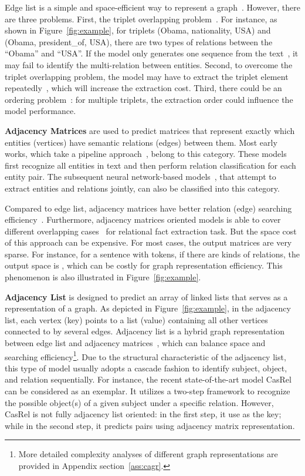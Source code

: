 \documentclass[11pt,a4paper]{article}
\begin{document}
Edge list is a simple and space-efficient way to represent a graph~\cite{arifuzzaman2015fast}. However, there are three problems. First, the triplet overlapping problem~\cite{zeng2018extracting}. For instance, as shown in Figure~\ref{fig:example}, for triplets (Obama, nationality, USA) and (Obama, president\_of, USA), there are two types of relations between the ``Obama'' and ``USA''. If the model only generates one sequence from the text~\cite{zheng2017joint}, it may fail to identify the multi-relation between entities. Second, to overcome the triplet overlapping problem, the model may have to extract the triplet element repeatedly~\cite{zeng2018extracting}, which will increase the extraction cost. Third, there could be an ordering problem~\cite{zeng2019learning}: for multiple triplets, the extraction order could influence the model performance.

\textbf{Adjacency Matrices} are used to predict matrices that represent exactly which entities (vertices) have semantic relations (edges) between them. Most early works, which take a pipeline approach~\cite{zelenko2003kernel,zhou2005exploring}, belong to this category. These models first recognize all entities in text and then perform relation classification for each entity pair. The subsequent neural network-based models~\cite{bekoulis2018joint,dai2019joint}, that attempt to extract entities and relations jointly, can also be classified into this category. 

Compared to edge list, adjacency matrices have better relation (edge) searching efficiency~\cite{arifuzzaman2015fast}. Furthermore, adjacency matrices oriented models is able to cover different overlapping cases~\cite{zeng2018extracting} for relational fact extraction task. But the space cost of this approach can be expensive. For most cases, the output matrices are very sparse. For instance, for a sentence with  tokens, if there are  kinds of relations, the output space is , which can be costly for graph representation efficiency. This phenomenon is also illustrated in Figure~\ref{fig:example}.

\textbf{Adjacency List} is designed to predict  
an array of linked lists that serves as a representation of a graph. As depicted in Figure~\ref{fig:example}, in the adjacency list, each vertex  (key) points to a list (value) containing all other vertices connected to  by several edges. Adjacency list is a hybrid graph representation between edge list and adjacency matrices~\cite{gross2005graph}, which can balance space and searching efficiency\footnote{More detailed complexity analyses of different graph representations are provided in Appendix section~\ref{ass:cagr}.}. Due to the structural characteristic of the adjacency list, this type of model usually adopts a cascade fashion to identify subject, object, and relation sequentially. For instance, the recent state-of-the-art model CasRel~\cite{wei2020novel} can be considered as an exemplar. It utilizes a two-step framework to recognize the possible object(s) of a given subject under a specific relation. However, CasRel is not fully adjacency list oriented: in the first step, it use  as the key; while in the second step, it predicts  pairs using adjacency matrix representation.
\end{document}
